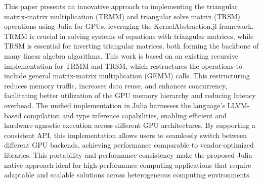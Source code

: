 This paper presents an innovative approach to implementing the triangular matrix-matrix multiplication (TRMM) and triangular solve matrix (TRSM) operations using Julia for GPUs, leveraging the KernelAbstraction.jl framework. TRMM is crucial in solving systems of equations with triangular matrices, while TRSM is essential for inverting triangular matrices, both forming the backbone of many linear algebra algorithms. This work is based on an existing recursive implementation for TRMM and TRSM, which restructures the operations to include general matrix-matrix multiplication (GEMM) calls. This restructuring reduces memory traffic, increases data reuse, and enhances concurrency, facilitating better utilization of the GPU memory hierarchy and reducing latency overhead. The unified implementation in Julia harnesses the language's LLVM-based compilation and type inference capabilities, enabling efficient and hardware-agnostic execution across different GPU architectures. By supporting a consistent API, this implementation allows users to seamlessly switch between different GPU backends, achieving performance comparable to vendor-optimized libraries. This portability and performance consistency make the proposed Julia-native approach ideal for high-performance computing applications that require adaptable and scalable solutions across heterogeneous computing environments.
